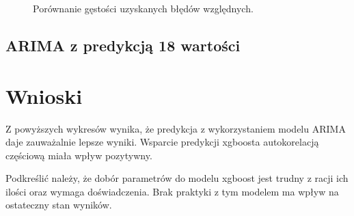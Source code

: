 \documentclass[11pt]{report}
\begin{document}
\begin{figure}[H]
    \centering
    \centering
    \def\svgwidth{\columnwidth}
    
    \caption{Porównanie gęstości uzyskanych błędów względnych.}
\end{figure}

\subsection{ARIMA z predykcją 18 wartości}

\section{Wnioski}
Z powyższych wykresów wynika, że predykcja z wykorzystaniem modelu ARIMA daje zauważalnie lepsze wyniki.
Wsparcie predykcji xgboosta autokorelacją częściową miała wpływ pozytywny.

Podkreślić należy, że dobór parametrów do modelu xgboost jest trudny z racji ich ilości oraz wymaga doświadczenia. 
Brak praktyki z tym modelem ma wpływ na ostateczny stan wyników.




\end{document}
